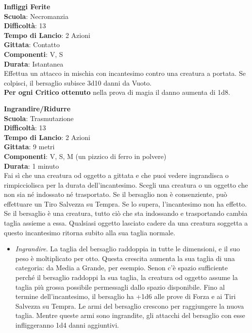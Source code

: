 \begin{multicols}{2}
\medskip\textbf{Infliggi Ferite}\\
\textbf{Scuola}: Necromanzia\\
\textbf{Difficoltà}: 13 \\
\textbf{Tempo di Lancio}: 2 Azioni\\
\textbf{Gittata}: Contatto\\
\textbf{Componenti}: V, S\\
\textbf{Durata}: Istantanea\\
Effettua un attacco in mischia con incantesimo contro una creatura a portata. Se colpisci, il bersaglio subisce 3d10 danni da Vuoto.\\
\textbf{Per ogni Critico ottenuto} nella prova di magia il danno aumenta di 1d8.

\medskip\textbf{Ingrandire/Ridurre}\\
\textbf{Scuola}: Trasmutazione\\
\textbf{Difficoltà}:  13\\
\textbf{Tempo di Lancio}: 2 Azioni\\
\textbf{Gittata}: 9 metri\\
\textbf{Componenti}: V, S, M (un pizzico di ferro in polvere)\\
\textbf{Durata}: 1 minuto\\
Fai sì che una creatura od oggetto a gittata e che puoi vedere ingrandisca o rimpicciolisca per la durata dell'incantesimo. Scegli una creatura o un oggetto che non sia né indossato né trasportato. Se il bersaglio non è consenziente, può effettuare un Tiro Salvezza su Tempra. Se lo supera, l'incantesimo non ha effetto. Se il bersaglio è una creatura, tutto ciò che sta indossando e trasportando cambia taglia assieme a essa. Qualsiasi oggetto lasciato cadere da una creatura soggetta a questo incantesimo ritorna subito alla sua taglia normale.\\
\medskip
\begin{itemize}
\item
\textit{Ingrandire}. La taglia del bersaglio raddoppia in tutte le dimensioni, e il suo peso è moltiplicato per otto. Questa crescita aumenta la sua taglia di una categoria: da Media a Grande, per esempio. Senon c’è spazio  sufficiente perché il bersaglio raddoppi la sua taglia, la creatura od oggetto assume la taglia più grossa possibile permessagli dallo spazio disponibile. Fino al termine dell'incantesimo, il bersaglio ha +1d6 alle prove di Forza e ai Tiri Salvezza su Tempra. Le armi del bersaglio crescono per raggiungere la nuova taglia. Mentre queste armi sono ingrandite, gli attacchi del bersaglio con esse infliggeranno 1d4 danni aggiuntivi. 

\end{itemize}
\end{multicols}
